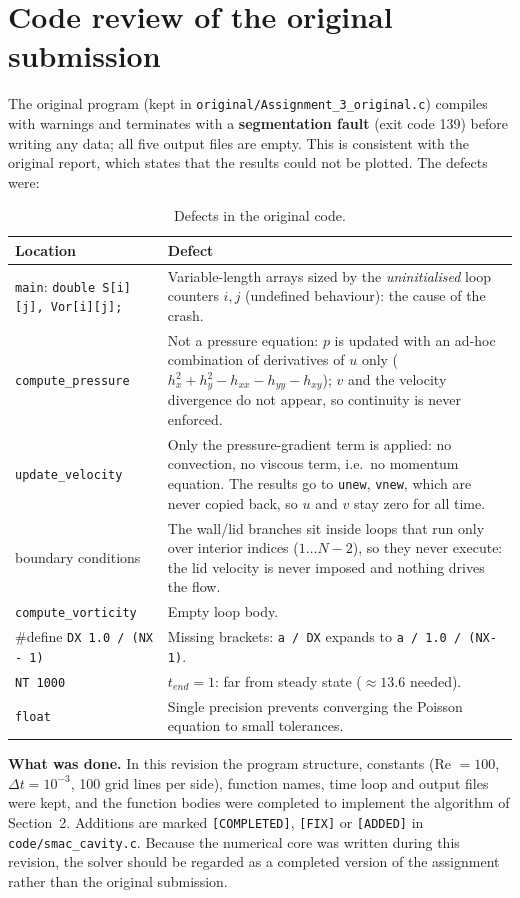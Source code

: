 \section{Code review of the original submission}
The original program (kept in \texttt{original/Assignment\_3\_original.c}) compiles with warnings and terminates with a \textbf{segmentation fault} (exit code 139) before writing any data; all five output files are empty. This is consistent with the original report, which states that the results could not be plotted. The defects were:
\begin{table}[H]\centering\small
\begin{tabular}{p{3.2cm}p{11.9cm}}\toprule
Location & Defect\\\midrule
\texttt{main}: \texttt{double S[i][j], Vor[i][j];} & Variable-length arrays sized by the \emph{uninitialised} loop counters $i,j$ (undefined behaviour): the cause of the crash.\\
\texttt{compute\_pressure} & Not a pressure equation: $p$ is updated with an ad-hoc combination of derivatives of $u$ only ($h_x^2+h_y^2-h_{xx}-h_{yy}-h_{xy}$); $v$ and the velocity divergence do not appear, so continuity is never enforced.\\
\texttt{update\_velocity} & Only the pressure-gradient term is applied: no convection, no viscous term, i.e.\ no momentum equation. The results go to \texttt{unew}, \texttt{vnew}, which are never copied back, so $u$ and $v$ stay zero for all time.\\
boundary conditions & The wall/lid branches sit inside loops that run only over interior indices ($1\ldots N-2$), so they never execute: the lid velocity is never imposed and nothing drives the flow.\\
\texttt{compute\_vorticity} & Empty loop body.\\
\#define \texttt{DX 1.0 / (NX - 1)} & Missing brackets: \texttt{a / DX} expands to \texttt{a / 1.0 / (NX-1)}.\\
\texttt{NT 1000} & $t_{end}=1$: far from steady state ($\approx13.6$ needed).\\
\texttt{float} & Single precision prevents converging the Poisson equation to small tolerances.\\\bottomrule
\end{tabular}\caption{Defects in the original code.}\end{table}
\textbf{What was done.} In this revision the program structure, constants (Re $=100$, $\Delta t=10^{-3}$, 100 grid lines per side), function names, time loop and output files were kept, and the function bodies were completed to implement the algorithm of Section~2. Additions are marked \texttt{[COMPLETED]}, \texttt{[FIX]} or \texttt{[ADDED]} in \texttt{code/smac\_cavity.c}. Because the numerical core was written during this revision, the solver should be regarded as a completed version of the assignment rather than the original submission.

